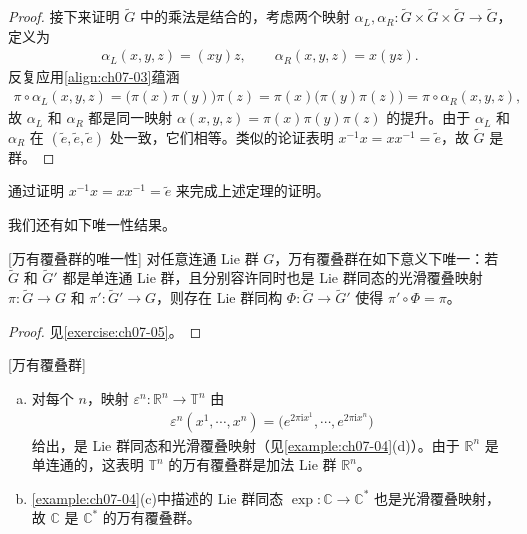 \documentclass[../../main.tex]{subfiles}
\begin{document}
\begin{proof}
接下来证明 $\widetilde{G}$ 中的乘法是结合的，考虑两个映射 $\alpha_L,\alpha_R\colon\widetilde{G}\times\widetilde{G}\times\widetilde{G}\to\widetilde{G}$，定义为
\begin{align*}
\alpha_L(x,y,z)=(xy)z,\qquad \alpha_R(x,y,z)=x(yz).
\end{align*}
反复应用\eqref{align:ch07-03}蕴涵
\begin{align*}
\pi\circ\alpha_L(x,y,z)=\bigl(\pi(x)\pi(y)\bigr)\pi(z)=\pi(x)\bigl(\pi(y)\pi(z)\bigr)=\pi\circ\alpha_R(x,y,z),
\end{align*}
故 $\alpha_L$ 和 $\alpha_R$ 都是同一映射 $\alpha(x,y,z)=\pi(x)\pi(y)\pi(z)$ 的提升。由于 $\alpha_L$ 和 $\alpha_R$ 在 $(\tilde{e},\tilde{e},\tilde{e})$ 处一致，它们相等。类似的论证表明 $x^{-1}x=xx^{-1}=\tilde{e}$，故 $\widetilde{G}$ 是群。
\end{proof}

\begin{exercise}\label{exercise:ch07-08}
通过证明 $x^{-1}x=xx^{-1}=\tilde{e}$ 来完成上述定理的证明。
\end{exercise}

我们还有如下唯一性结果。

\begin{theorem}\label{theorem:ch07-09}[万有覆叠群的唯一性]
对任意连通 Lie 群 $G$，万有覆叠群在如下意义下唯一：若 $\widetilde{G}$ 和 $\widetilde{G}'$ 都是单连通 Lie 群，且分别容许同时也是 Lie 群同态的光滑覆叠映射 $\pi\colon\widetilde{G}\to G$ 和 $\pi'\colon\widetilde{G}'\to G$，则存在 Lie 群同构 $\Phi\colon\widetilde{G}\to\widetilde{G}'$ 使得 $\pi'\circ\Phi=\pi$。
\end{theorem}

\begin{proof}
见\cref{exercise:ch07-05}。
\end{proof}

\begin{example}\label{example:ch07-10}[万有覆叠群]
\begin{enumerate}[(a)]
\item 对每个 $n$，映射 $\varepsilon^n\colon\mathbb{R}^n\to\mathbb{T}^n$ 由
\begin{align*}
\varepsilon^n(x^1,\cdots ,x^n)=\bigl(e^{2\pi\mathrm{i}x^1},\cdots ,e^{2\pi\mathrm{i}x^n}\bigr)
\end{align*}
给出，是 Lie 群同态和光滑覆叠映射（见\cref{example:ch07-04}(d)）。由于 $\mathbb{R}^n$ 是单连通的，这表明 $\mathbb{T}^n$ 的万有覆叠群是加法 Lie 群 $\mathbb{R}^n$。

\item \cref{example:ch07-04}(c)中描述的 Lie 群同态 $\exp\colon\mathbb{C}\to\mathbb{C}^*$ 也是光滑覆叠映射，故 $\mathbb{C}$ 是 $\mathbb{C}^*$ 的万有覆叠群。
\end{enumerate}
\end{example}
\end{document}
